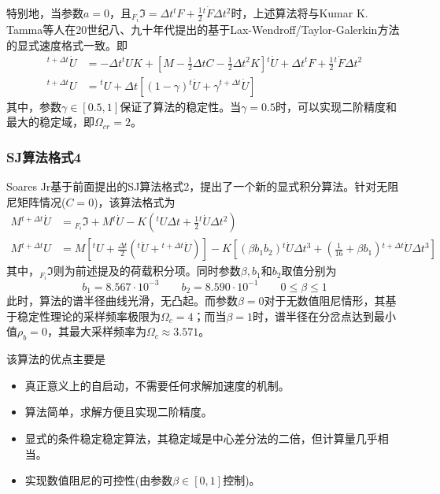 特别地，当参数$a=0$，且${_{F_i}\!\Im}=\Delta t{^t\!F}+\frac{1}{2}{^t\!\dot{F}}\Delta t^2$时，上述算法将与Kumar K. Tamma等人在20世纪八、九十年代提出的基于Lax-Wendroff/Taylor-Galerkin方法的显式速度格式\cite{Tamma1988,Tamma1988c,Tamma1989,Tamma1990a}一致。即
\begin{align}
[M+\frac{1}{2}C\Delta t]{^{t+\Delta t}\!\dot{U}}&=-\Delta t{^t\!U}K+[M-\frac{1}{2}\Delta tC-\frac{1}{2}\Delta t^2K]{^t\!\dot{U}}+\Delta t{^t\!F}+\frac{1}{2}{^t\!\dot{F}}\Delta t^2\\
{^{t+\Delta t}\!U}&={^t\!U}+\Delta t[(1-\gamma){^t\!\dot{U}}+\gamma{^{t+\Delta t}\!\dot{U}}]
\end{align}
其中，参数$\gamma\in[0.5,1]$保证了算法的稳定性。当$\gamma=0.5$时，可以实现二阶精度和最大的稳定域，即$\Omega_{cr}=2$。

\subsubsection{SJ算法格式4\cite{SoaresJr2016a}}
Soares Jr基于前面提出的SJ算法格式2\cite{Jr2014}，提出了一个新的显式积分算法\cite{SoaresJr2016a}。针对无阻尼矩阵情况($C=0$)，该算法格式为
\begin{align}
 M{^{t+\Delta t}\!\dot{U}}&={_{F_i}\!\Im}+M{^t\!\dot{U}}-K({^t\!U}\Delta t+\frac12{^t\!\dot{U}}\Delta t^2)\\
 M{^{t+\Delta t}\!U}&=M[{^t\!U}+\frac{\Delta t}{2}({^t\!\dot{U}}+{^{t+\Delta t}\!\dot{U}})]-K[(\beta b_1b_2){^t\!\dot{U}}\Delta t^3+(\frac{1}{16}+\beta b_1){^{t+\Delta t}\!\dot{U}}\Delta t^3]
\end{align}
其中，${_{F_i}\!\Im}$则为前述提及的荷载积分项。同时参数$\beta,b_1$和$b_2$取值分别为
\begin{equation}
b_1=8.567\cdot10^{-3}\qquad b_2=8.590\cdot10^{-1}\qquad 0\le\beta\le1
\end{equation}
此时，算法的谱半径曲线光滑，无凸起。而参数$\beta=0$对于无数值阻尼情形，其基于稳定性理论的采样频率极限为$\Omega_c=4$；而当$\beta=1$时，谱半径在分岔点达到最小值$\rho_b=0$，其最大采样频率为$\Omega_c\approx3.571$。

该算法的优点主要是
\begin{itemize}
\item[\ddag] 真正意义上的自启动，不需要任何求解加速度的机制。
\item[\ddag] 算法简单，求解方便且实现二阶精度。
\item[\ddag] 显式的条件稳定稳定算法，其稳定域是中心差分法的二倍，但计算量几乎相当。
\item[\ddag] 实现数值阻尼的可控性(由参数$\beta\in[0,1]$控制)。
\end{itemize}

